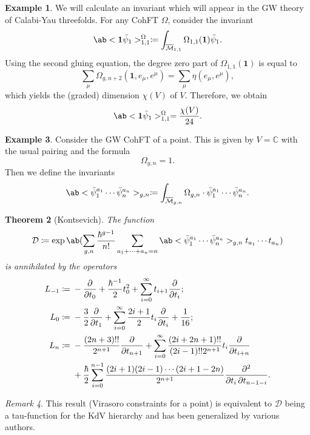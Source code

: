 \documentclass{amsart}
\newtheorem{thm}{Theorem}[section]
\theoremstyle{definition}
\newtheorem{exm}[thm]{Example}
\theoremstyle{remark}
\newtheorem{rmk}[thm]{Remark}
\theoremstyle{plain}
\theoremstyle{definition}
\theoremstyle{remark}
\newcommand{\C}{\mathbb{C}}
\newcommand{\Mbar}{\overline{\mathcal{M}}}
\newcommand{\mc}[1]{\mathcal{#1}}
\newcommand{\1}{\mathbf{1}}
\newcommand{\2}{\mathbf{2}}
\newcommand{\3}{\mathbf{3}}
\begin{document}
\begin{exm}
    We will calculate an invariant which will appear in the GW theory of Calabi-Yau threefolds. For any CohFT $\Omega$, consider the invariant
    \[ \ab<\1\bar{\psi}_1>_{1,1}^{\Omega}\coloneqq \int_{\Mbar_{1,1}} \Omega_{1,1}(\1)\bar{\psi}_1. \]
    Using the second gluing equation, the degree zero part of $\Omega_{1,1}(\1)$ is equal to
    \[ \sum_{\mu} \Omega_{g,n+2}(\1, e_{\mu}, e^{\mu}) = \sum_{\mu} \eta(e_{\mu}, e^{\mu}), \]
    which yields the (graded) dimension $\chi(V)$ of $V$. Therefore, we obtain
    \[ \ab<\1\bar{\psi}_1>_{1,1}^{\Omega} = \frac{\chi(V)}{24}. \]
\end{exm}

\begin{exm}
    Consider the GW CohFT of a point. This is given by $V = \C$ with the usual pairing and the formula 
    \[ \Omega_{g,n} = 1. \]
    Then we define the invariants
    \[ \ab<\bar{\psi}_1^{a_1} \cdots \bar{\psi}_n^{a_n}>_{g,n} \coloneqq \int_{\Mbar_{g,n}} \Omega_{g,n} \cdot \bar{\psi}_1^{a_1} \cdots \bar{\psi}_n^{a_n}. \]
    \begin{thm}[Kontsevich]
        The function
        \[ \mc{D} \coloneqq \exp \ab(\sum_{g,n} \frac{\hbar^{g-1}}{n!}\sum_{a_1 + \cdots + a_n = n} \ab<\bar{\psi}_1^{a_1} \cdots \bar{\psi}_n^{a_n}>_{g,n} t_{a_1}\cdots t_{a_n}) \]
        is annihilated by the operators
        \begin{align*}
            L_{-1} \coloneqq{}& -\pdv{}{t_0} + \frac{\hbar^{-1}}{2} t_0^2 + \sum_{i=0}^{\infty} t_{i+1} \pdv{}{t_i};\\
            L_0 \coloneqq{}& -\frac{3}{2} \pdv{}{t_1} + \sum_{i=0}^{\infty} \frac{2i+1}{2} t_i \pdv{}{t_i} + \frac{1}{16};\\
            L_n \coloneqq{}& -\frac{(2n+3)!!}{2^{n+1}} \pdv{}{t_{n+1}} + \sum_{i=0}^{\infty} \frac{(2i+2n+1)!!}{(2i-1)!! 2^{n+1}} t_i \pdv{}{t_{i+n}} \\
            &+ \frac{\hbar}{2} \sum_{i=0}^{n-1} \frac{(2i+1) (2i-1) \cdots (2i+1-2n)}{2^{n+1}} \pdv{}{t_i,t_{n-1-i}}.
        \end{align*}
    \end{thm}
\end{exm}

\begin{rmk}
    This result (Virasoro constraints for a point) is equivalent to $\mc{D}$ being a tau-function for the KdV hierarchy and has been generalized by various authors.
\end{rmk}
\end{document}
